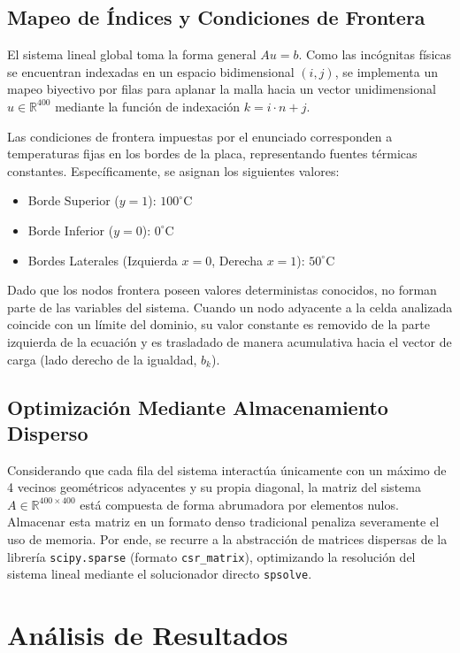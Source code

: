 \documentclass[12pt]{article}
\begin{document}
    \subsection{Mapeo de Índices y Condiciones de Frontera}
    El sistema lineal global toma la forma general $Au = b$. Como las incógnitas físicas se encuentran indexadas en un espacio bidimensional $(i, j)$, se implementa un mapeo biyectivo por filas para aplanar la malla hacia un vector unidimensional $u \in \mathbb{R}^{400}$ mediante la función de indexación $k = i \cdot n + j$.

    Las condiciones de frontera impuestas por el enunciado corresponden a temperaturas fijas en los bordes de la placa, representando fuentes térmicas constantes. Específicamente, se asignan los siguientes valores:
    \begin{itemize}
        \item Borde Superior ($y=1$): $100^\circ\text{C}$
        \item Borde Inferior ($y=0$): $0^\circ\text{C}$
        \item Bordes Laterales (Izquierda $x=0$, Derecha $x=1$): $50^\circ\text{C}$
    \end{itemize}

    Dado que los nodos frontera poseen valores deterministas conocidos, no forman parte de las variables del sistema. Cuando un nodo adyacente a la celda analizada coincide con un límite del dominio, su valor constante es removido de la parte izquierda de la ecuación y es trasladado de manera acumulativa hacia el vector de carga (lado derecho de la igualdad, $b_k$).
    \subsection{Optimización Mediante Almacenamiento Disperso}
    Considerando que cada fila del sistema interactúa únicamente con un máximo de 4 vecinos geométricos adyacentes y su propia diagonal, la matriz del sistema $A \in \mathbb{R}^{400 \times 400}$ está compuesta de forma abrumadora por elementos nulos. Almacenar esta matriz en un formato denso tradicional penaliza severamente el uso de memoria. Por ende, se recurre a la abstracción de matrices dispersas de la librería \texttt{scipy.sparse} (formato \texttt{csr\_matrix}), optimizando la resolución del sistema lineal mediante el solucionador directo \texttt{spsolve}.

    \section{Análisis de Resultados}
\end{document}
